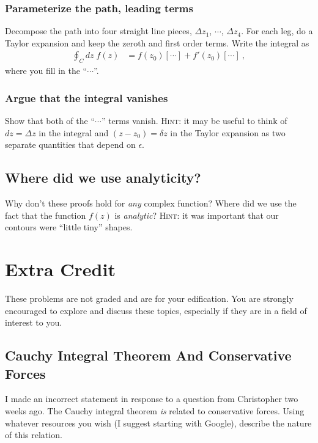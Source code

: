 \documentclass[12pt]{article}
\numberwithin{equation}{subsection}    %
\begin{document}
\subsubsection{Parameterize the path, leading terms}

Decompose the path into four straight line pieces, $\Delta z_1$, $\cdots$, $\Delta z_4$. For each leg, do a Taylor expansion and keep the zeroth and first order terms. Write the integral as
\begin{align}
	\oint_C dz\; f(z) &=
	f(z_0) \left[ \cdots \right]
	+ f'(z_0) \left[ \cdots \right] \ ,
\end{align}
	where you fill in the ``$\cdots$''. 

\subsubsection{Argue that the integral vanishes}

Show that both of the ``$\cdots$'' terms vanish. \textsc{Hint}: it may be useful to think of $dz = \Delta z$ in the integral and $(z-z_0) = \delta z$ in the Taylor expansion as two separate quantities that depend on $\epsilon$.


\subsection{Where did we use analyticity?}

Why don't these proofs hold for \emph{any} complex function? Where did we use the fact that the function $f(z)$ is \emph{analytic}? 
\textsc{Hint}: it was important that our contours were ``little tiny'' shapes. 




\section{Extra Credit}

These problems are not graded and are for your edification. You are strongly encouraged to explore and discuss these topics, especially if they are in a field of interest to you.

\subsection{Cauchy Integral Theorem And Conservative Forces} 

I made an incorrect statement in response to a question from Christopher two weeks ago. The Cauchy integral theorem \emph{is} related to conservative forces. Using whatever resources you wish (I suggest starting with Google), describe the nature of this relation.
\end{document}
